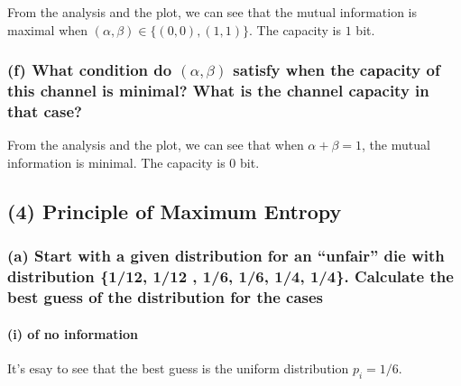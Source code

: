 From the analysis and the plot, we can see that the mutual information
is maximal when \((\alpha, \beta) \in \{(0,0),(1,1)\}\). The capacity is
\(1\) bit.

\hypertarget{f-what-condition-do-alpha-beta-satisfy-when-the-capacity-of-this-channel-is-minimal-what-is-the-channel-capacity-in-that-case}{%
\subsubsection{\texorpdfstring{(f) What condition do \((\alpha, \beta)\)
satisfy when the capacity of this channel is minimal? What is the
channel capacity in that
case?}{(f) What condition do (\textbackslash alpha, \textbackslash beta) satisfy when the capacity of this channel is minimal? What is the channel capacity in that case?}}\label{f-what-condition-do-alpha-beta-satisfy-when-the-capacity-of-this-channel-is-minimal-what-is-the-channel-capacity-in-that-case}}

From the analysis and the plot, we can see that when \(\alpha+\beta=1\),
the mutual information is minimal. The capacity is \(0\) bit.

\hypertarget{principle-of-maximum-entropy}{%
\subsection{(4) Principle of Maximum
Entropy}\label{principle-of-maximum-entropy}}

\hypertarget{a-start-with-a-given-distribution-for-an-unfair-die-with-distribution-112-112-16-16-14-14.-calculate-the-best-guess-of-the-distribution-for-the-cases}{%
\subsubsection{(a) Start with a given distribution for an ``unfair'' die
with distribution \{1/12, 1/12 , 1/6, 1/6, 1/4, 1/4\}. Calculate the
best guess of the distribution for the
cases}\label{a-start-with-a-given-distribution-for-an-unfair-die-with-distribution-112-112-16-16-14-14.-calculate-the-best-guess-of-the-distribution-for-the-cases}}

\hypertarget{i-of-no-information}{%
\paragraph{(i) of no information}\label{i-of-no-information}}

It's esay to see that the best guess is the uniform distribution
\(p_i=1/6\).

